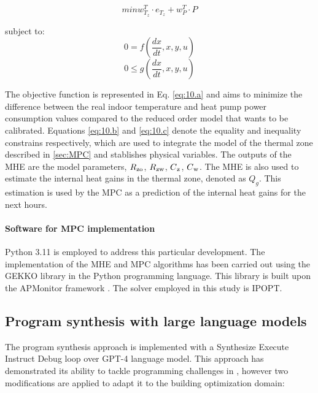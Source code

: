 \begin{equation}
min w_{T_z}^T \cdot e_{T_z} + w_{P}^T \cdot P
\label{eq:10.a}
\end{equation}

subject to:
\begin{equation}
0=f(\frac{dx}{dt},x,y,u)
\label{eq:10.b}
\end{equation}
\begin{equation}
0\leq g(\frac{dx}{dt},x,y,u)
\label{eq:10.c}
\end{equation}

The objective function is represented in Eq. \ref{eq:10.a} and aims to minimize the difference between the real indoor temperature and heat pump power consumption values compared to the reduced order model that wants to be calibrated. Equations \ref{eq:10.b} and \ref{eq:10.c} denote the equality and inequality constrains respectively, which are used to integrate the model of the thermal zone described in \ref{sec:MPC} and stablishes physical variables. The outputs of the MHE are the model parameters, $R\textsubscript{zo}$, $R\textsubscript{zw}$, $C\textsubscript{z}$, $C\textsubscript{w}$. 
The MHE is also used to estimate the internal heat gains in the thermal zone, denoted as $Q_g$. This estimation is used by the MPC as a prediction of the internal heat gains for the next hours. 

\paragraph{Software for MPC implementation} Python 3.11 is employed to address this particular development. The implementation of the MHE and MPC algorithms has been carried out using the GEKKO library \cite{Beal2018} in the Python programming language. This library is built upon the APMonitor framework \cite{Hedengren2014}. The solver employed in this study is IPOPT.

\newpage
\subsection{Program synthesis with large language models}
\label{sec:ProgramSynthesis}
The program synthesis approach is implemented with a Synthesize Execute Instruct Debug loop over GPT-4 \cite{GPT2023} language model. This approach has demonstrated its ability to tackle programming challenges in \cite{Reflexion2023,teaching2023,Fully2023}, however two modifications are applied to adapt it to the building optimization domain:

